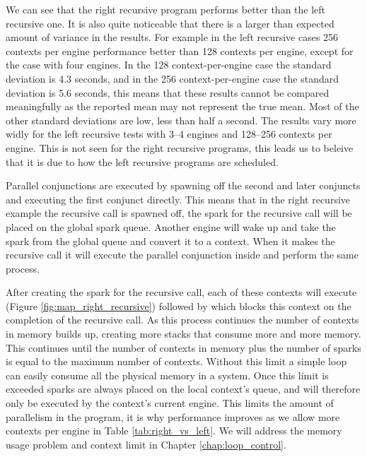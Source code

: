 We can see that the right recursive program performs better than the left
recursive one.
It is also quite noticeable that there is a larger than expected amount of
variance in the results.
For example in the left recursive cases 256 contexts per engine
performance better than 128 contexts per engine,
except for the case with four engines.
In the 128 context-per-engine case the standard deviation is 4.3 seconds,
and in the 256 context-per-engine case the standard deviation is 5.6
seconds,
this means that these results cannot be compared meaningfully as the
reported mean may not represent the true mean.
Most of the other standard deviations are low, less than half a second.
The results vary more widly for the left recursive tests with 3--4 engines
and 128--256 contexts per engine.
This is not seen for the right recursive programs,
this leads us to beleive that it is due to how the left recursive programs
are scheduled.

Parallel conjunctions are executed by spawning off the second and later
conjuncts and executing the first conjunct directly.
This means that in the right recursive example the recursive call is spawned
off,
the spark for the recursive call will be placed on the global spark queue.
Another engine will wake up and take the spark from the global queue and
convert it to a context.
When it makes the recursive call it will execute the parallel conjunction
inside and perform the same process.

After creating the spark for the recursive call,
each of these contexts will execute 
(Figure \ref{fig:map_right_recursive})
followed by \joinandcontinue which blocks this context on the completion of
the recursive call.
As this process continues the number of contexts in memory builds up,
creating more stacks that consume more and more memory.
This continues until the number of contexts in memory plus
the number of sparks is equal to the maximum number of contexts.
Without this limit a simple loop can easily consume all the physical memory
in a system.
Once this limit is exceeded sparks are always placed on the local context's
queue, and will therefore only be executed by the context's current engine.
This limits the amount of parallelism in the program,
it is why performance improves as we allow more contexts per engine in
Table \ref{tab:right_vs_left}.
We will address the memory usage problem and context limit in
Chapter \ref{chap:loop_control}.

